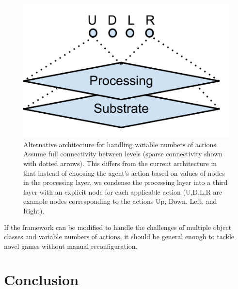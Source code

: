 \documentclass{article}
\begin{document}
\begin{figure}[htp]
\begin{center}
\includegraphics[scale=1]{figures/possiblearch}
\end{center}
\caption{Alternative architecture for handling variable numbers of actions. Assume full connectivity between levels (sparse connectivity shown with dotted arrows). This differs from the current architecture in that instead of choosing the agent's action based on values of nodes in the processing layer, we condense the processing layer into a third layer with an explicit node for each applicable action (U,D,L,R are example nodes corresponding to the actions Up, Down, Left, and Right).}
\label{fig:possiblearch}
\end{figure}

If the framework can be modified to handle the challenges of multiple object classes and variable numbers of actions, it should be general enough to tackle novel games without manual reconfiguration.

\section{Conclusion}


	

\end{document}
